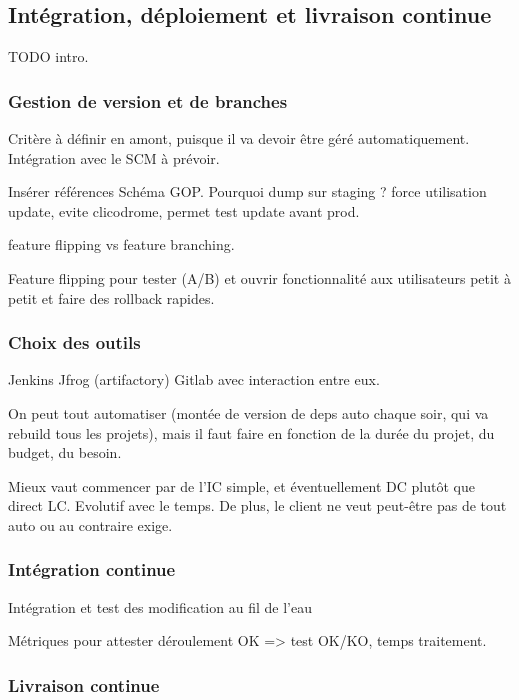 \subsection{Intégration, déploiement et livraison continue}

TODO intro.

\subsubsection{Gestion de version et de branches}

Critère à définir en amont, puisque il va devoir être géré automatiquement. Intégration avec le SCM à prévoir.

Insérer références Schéma GOP. Pourquoi dump sur staging ? force utilisation update, evite clicodrome, permet test update avant prod.

feature flipping vs feature branching.


Feature flipping pour tester (A/B) et ouvrir fonctionnalité aux utilisateurs petit à petit et faire des rollback rapides.

\subsubsection{Choix des outils}

Jenkins Jfrog (artifactory) Gitlab avec interaction entre eux.

On peut tout automatiser (montée de version de deps auto chaque soir, qui va rebuild tous les projets), mais il faut faire en fonction de la durée du projet, du budget, du besoin.

Mieux vaut commencer par de l'IC simple, et éventuellement DC plutôt que direct LC. Evolutif avec le temps. De plus, le client ne veut peut-être pas de tout auto ou au contraire exige.

\subsubsection{Intégration continue}

Intégration et test des modification au fil de l'eau

Métriques pour attester déroulement OK => test OK/KO, temps traitement. 

\subsubsection{Livraison continue}

